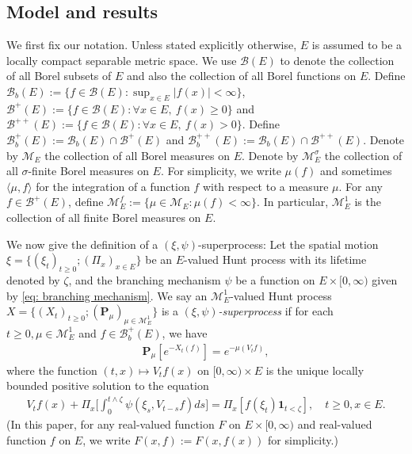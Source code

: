 \documentclass[12pt,a4paper]{amsart}
\theoremstyle{definition}
\numberwithin{equation}{section}
\begin{document}
\subsection{Model and results}

We first fix our notation.
Unless stated explicitly otherwise, $E$ is assumed to be a locally compact separable metric space. 
We use $\mathscr B(E)$ to denote the collection of all  Borel subsets of $E$ and also the collection of all  Borel functions on $E$. Define $\mathscr B_b(E) :=\{f \in \mathscr B(E): \sup_{x\in E}|f(x)|<\infty \}$, $\mathscr B^+(E) :=\{f\in \mathscr B(E): \forall x\in E,~f(x)\geq 0\}$ and $\mathscr B^{++}(E) :=\{f\in \mathscr B(E): \forall x\in E,~f(x)> 0\}$.
Define $\mathscr B^+_b(E) := \mathscr B_b(E) \cap \mathscr B^+(E)$ and $\mathscr B^{++}_b(E):= \mathscr B_b(E) \cap \mathscr B^{++}(E)$.
Denote by $\mathcal M_E$ the collection of all Borel measures on $E$.
Denote by $\mathcal M^\sigma_E$ the collection of all  $\sigma$-finite Borel measures on $E$.
For simplicity, we write $\mu(f)$ and sometimes $\langle \mu, f\rangle$ for the integration of a function $f$ with respect to a measure $\mu$.
For any $f \in \mathscr B^+(E)$, define $\mathcal M^f_E:= \{\mu \in \mathcal M_E: \mu(f) < \infty\}$. In particular, $\mathcal M^1_E$ is the collection of all  finite Borel measures on $E$.
	
We now give the definition of a $(\xi, \psi)$-superprocess:
Let the spatial motion 
$\xi=\{(\xi_t)_{t\geq 0};(\Pi_x)_{x\in E}\}$ be an $E$-valued Hunt process with its lifetime denoted by $\zeta$, and the branching mechanism $\psi$ be a function on $E\times[0,\infty)$ given by \eqref{eq: branching mechanism}.
We say an $\mathcal M^1_E$-valued Hunt process $X=\{(X_t)_{t\geq 0}; (\mathbf P_\mu)_{\mu \in \mathcal M^1_E}\}$ is a \emph{$(\xi,\psi)$-superprocess} if for each $t\geq 0, \mu \in \mathcal M_E^1$ and  $f\in \mathscr B^+_b(E)$, we have
\begin{align}
	\mathbf P_\mu [e^{-X_t(f)}] = e^{-\mu(V_tf)},
\end{align}
where the function $(t,x) \mapsto V_tf(x)$ on $[0,\infty) \times E$ is the unique locally bounded positive solution to the equation
\begin{align}\label{eq:FKPP_in_definition}
	V_t f(x) + \Pi_x \Big[  \int_0^{t\wedge \zeta} \psi (\xi_s,V_{t-s} f) ds \Big]
	= \Pi_x [ f(\xi_t)\mathbf 1_{t<\zeta} ],
	\quad t \geq 0, x \in E.
\end{align}
(In this paper, for any real-valued function $F$ on $E\times [0,\infty)$ and real-valued function $f$ on $E$, we write $F(x,f):= F(x,f(x))$ for simplicity.)
\end{document}
